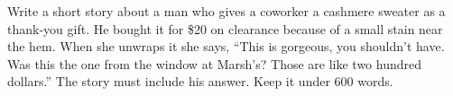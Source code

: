 Write a short story about a man who gives a coworker a cashmere sweater as a thank-you gift. He bought it for \$20 on clearance because of a small stain near the hem. When she unwraps it she says, ``This is gorgeous, you shouldn't have. Was this the one from the window at Marsh's? Those are like two hundred dollars.'' The story must include his answer. Keep it under 600 words.
